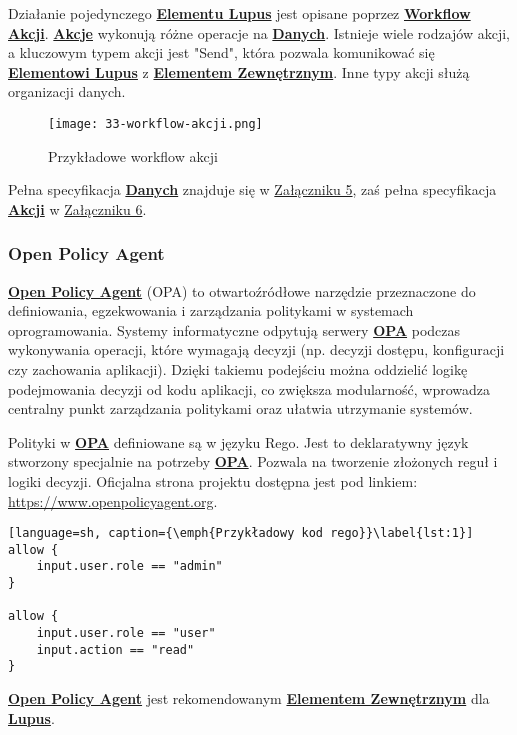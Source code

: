 Działanie pojedynczego \hyperlink{def:element-lupus}{\textbf{Elementu Lupus}} jest opisane poprzez \hyperlink{def:workflow-petli}{\textbf{Workflow Akcji}}. \hyperlink{def:akcja}{\textbf{Akcje}} wykonują różne operacje na \hyperlink{def:dane}{\textbf{Danych}}. Istnieje wiele rodzajów akcji, a kluczowym typem akcji jest "Send", która pozwala komunikować się \hyperlink{def:element-lupus}{\textbf{Elementowi Lupus}} z \hyperlink{def:element-zewnetrzny}{\textbf{Elementem Zewnętrznym}}. Inne typy akcji służą organizacji danych.

\begin{figure}[!h]
    \centering \texttt{[image: 33-workflow-akcji.png]}
    \caption{Przykładowe workflow akcji}\label{fig:33-workflow-akcji}
\end{figure}

Pełna specyfikacja \hyperlink{def:dane}{\textbf{Danych}} znajduje się w \hyperref[appendix:5]{Załączniku 5}, zaś pełna specyfikacja \hyperlink{def:akcja}{\textbf{Akcji}} w \hyperref[appendix:6]{Załączniku 6}.

\subsubsection{Open Policy Agent}

\hyperlink{def:opa}{\textbf{Open Policy Agent}} (OPA) to otwartoźródłowe narzędzie przeznaczone do definiowania, egzekwowania i zarządzania politykami w systemach oprogramowania. Systemy informatyczne odpytują serwery \hyperlink{def:opa}{\textbf{OPA}} podczas wykonywania operacji, które wymagają decyzji (np. decyzji dostępu, konfiguracji czy zachowania aplikacji). Dzięki takiemu podejściu można oddzielić logikę podejmowania decyzji od kodu aplikacji, co zwiększa modularność, wprowadza centralny punkt zarządzania politykami oraz ułatwia utrzymanie systemów.

Polityki w \hyperlink{def:opa}{\textbf{OPA}} definiowane są w języku Rego. Jest to deklaratywny język stworzony specjalnie na potrzeby \hyperlink{def:opa}{\textbf{OPA}}. Pozwala na tworzenie złożonych reguł i logiki decyzji. Oficjalna strona projektu dostępna jest pod linkiem: \url{https://www.openpolicyagent.org}.

\begin{lstlisting}[language=sh, caption={\emph{Przykładowy kod rego}}\label{lst:1}]
allow {
    input.user.role == "admin"
}

allow {
    input.user.role == "user"
    input.action == "read"
}
\end{lstlisting}

\hyperlink{def:opa}{\textbf{Open Policy Agent}} jest rekomendowanym \hyperlink{def:element-zewnetrzny}{\textbf{Elementem Zewnętrznym}} dla \hyperlink{def:lupus}{\textbf{Lupus}}.